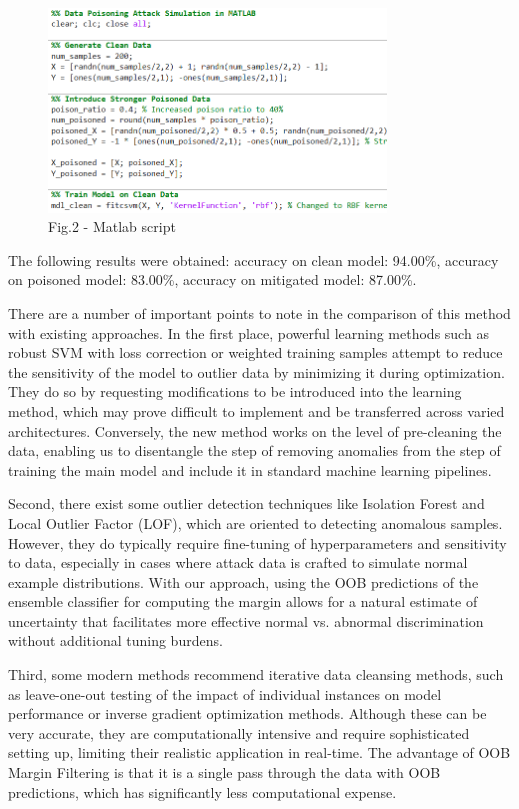 \begin{figure}[H]
	\centering
	\includegraphics[width=0.8\textwidth]{media/ict2/image225}
	\caption*{Fig.2 - Matlab script}
\end{figure}

\begin{multicols}{2}
The following results were obtained: accuracy on clean model: 94.00\%,
accuracy on poisoned model: 83.00\%, accuracy on mitigated model:
87.00\%.

There are a number of important points to note in the comparison of this
method with existing approaches. In the first place, powerful learning
methods such as robust SVM with loss correction or weighted training
samples attempt to reduce the sensitivity of the model to outlier data
by minimizing it during optimization. They do so by requesting
modifications to be introduced into the learning method, which may prove
difficult to implement and be transferred across varied architectures.
Conversely, the new method works on the level of pre-cleaning the data,
enabling us to disentangle the step of removing anomalies from the step
of training the main model and include it in standard machine learning
pipelines.

Second, there exist some outlier detection techniques like Isolation
Forest and Local Outlier Factor (LOF), which are oriented to detecting
anomalous samples. However, they do typically require fine-tuning of
hyperparameters and sensitivity to data, especially in cases where
attack data is crafted to simulate normal example distributions. With
our approach, using the OOB predictions of the ensemble classifier for
computing the margin allows for a natural estimate of uncertainty that
facilitates more effective normal vs. abnormal discrimination without
additional tuning burdens.

Third, some modern methods recommend iterative data cleansing methods,
such as leave-one-out testing of the impact of individual instances on
model performance or inverse gradient optimization methods. Although
these can be very accurate, they are computationally intensive and
require sophisticated setting up, limiting their realistic application
in real-time. The advantage of OOB Margin Filtering is that it is a
single pass through the data with OOB predictions, which has
significantly less computational expense.
\end{multicols}


